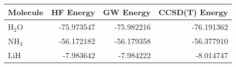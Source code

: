 \begin{tabular}{lrrr}
\toprule
Molecule & HF Energy & GW Energy & CCSD(T) Energy \\
\midrule
H$_2$O & -75.973547 & -75.982216 & -76.191362 \\
NH$_3$ & -56.172182 & -56.179358 & -56.377910 \\
LiH & -7.983642 & -7.984222 & -8.014747 \\
\bottomrule
\end{tabular}
